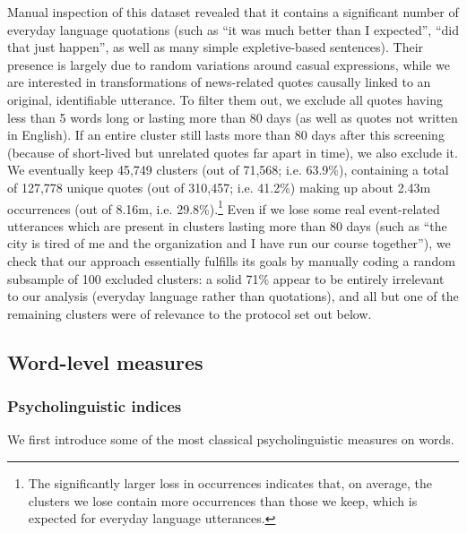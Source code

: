 Manual inspection of this dataset revealed that it contains a significant number of everyday language quotations (such as ``it was much better than I expected'', ``did that just happen'', as well as many simple expletive-based sentences).
Their presence is largely due to random variations around casual expressions, while we are interested in transformations of news-related quotes causally linked to an original, identifiable utterance.
To filter them out, we exclude all quotes having less than 5 words long or lasting more than 80 days %
 (as well as quotes not written in English). If an entire cluster still lasts more than 80 days after this screening (because of short-lived but unrelated quotes far apart in time), we also exclude it.
We eventually keep 45,749 clusters (out of 71,568; i.e. 63.9\%), containing a total of 127,778 unique quotes (out of 310,457; i.e. 41.2\%) making up about 2.43m occurrences (out of 8.16m, i.e. 29.8\%).\footnote{The significantly larger loss in occurrences indicates that, on average, the clusters we lose contain more occurrences than those we keep, which is expected for everyday language utterances.}
Even if we lose some real event-related utterances which are present in clusters lasting more than 80 days (such as ``the city is tired of me and the organization and I have run our course together''), we check that our approach essentially fulfills its goals by manually coding a random subsample of 100 excluded clusters: a solid 71\% appear to be entirely irrelevant to our analysis (everyday language rather than quotations), and all but one of the remaining clusters were of relevance to the protocol {set out below.}%


\subsection{Word-level measures}

\subsubsection{Psycholinguistic indices}

We first introduce some of the most classical psycholinguistic measures on words.

